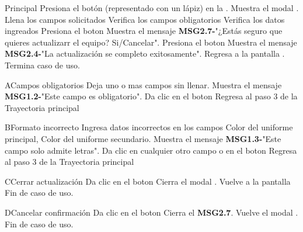 	\begin{UCtrayectoria}{Principal}
	\UCpaso[\UCactor] Presiona el botón  (representado con un lápiz) en la .
	\UCpaso Muestra el modal .
	\UCpaso[\UCactor] Llena los campos solicitados
	\UCpaso Verifica los campos obligatorios  
	\UCpaso Verifica los datos ingreados  
	\UCpaso[\UCactor] Presiona el boton  
	\UCpaso Muestra el mensaje {\bf MSG2.7-}"¿Estás seguro que quieres actualizarr el equipo? Si/Cancelar".
	\UCpaso[\UCactor] Presiona el boton  
	\UCpaso Muestra el mensaje {\bf MSG2.4-}"La actualización se completo exitosamente".
	\UCpaso Regresa a la pantalla .
	\UCpaso Termina caso de uso.
\end{UCtrayectoria}
	
	\begin{UCtrayectoriaA}{A}{Campos obligatorios}
	\UCpaso[\UCactor] Deja uno o mas campos sin llenar.
	\UCpaso Muestra el mensaje {\bf MSG1.2-}"Este campo es obligatorio".
	\UCpaso[\UCactor] Da clic en el boton 
	\UCpaso Regresa al paso 3 de la Trayectoria principal
\end{UCtrayectoriaA}

\begin{UCtrayectoriaA}{B}{Formato incorrecto}
	\UCpaso[\UCactor] Ingresa datos incorrectos en los campos Color del uniforme principal, Color del uniforme secundario.
	\UCpaso Muestra el mensaje  {\bf MSG1.3-}"Este campo solo admite letras".
	\UCpaso[\UCactor] Da clic en cualquier otro campo o en el boton 
	\UCpaso Regresa al paso 3 de la Trayectoria principal
\end{UCtrayectoriaA}

\begin{UCtrayectoriaA}{C}{Cerrar actualización}
	\UCpaso[\UCactor] Da clic en el boton 
	\UCpaso Cierra el modal .
	\UCpaso Vuelve a la pantalla 
	\UCpaso Fin de caso de uso.
\end{UCtrayectoriaA}

\begin{UCtrayectoriaA}{D}{Cancelar confirmación}
	\UCpaso[\UCactor] Da clic en el boton 
	\UCpaso Cierra el  {\bf MSG2.7}.
	\UCpaso Vuelve el modal .
	\UCpaso Fin de caso de uso.
\end{UCtrayectoriaA}
